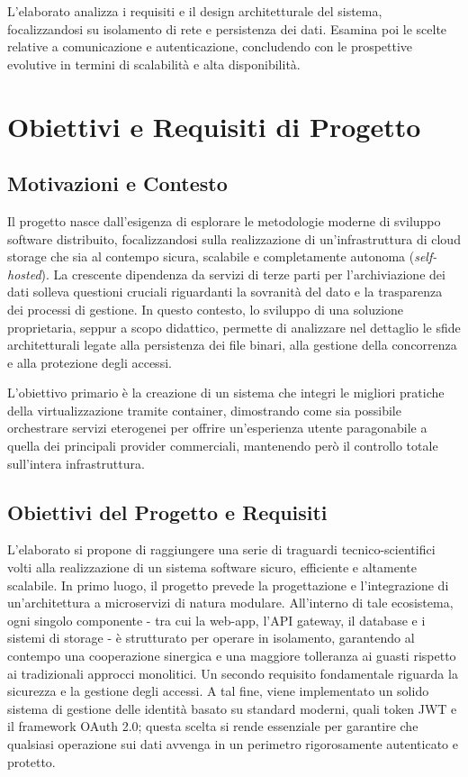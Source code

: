 \documentclass[12pt,a4paper]{report}
\begin{document}
L'elaborato analizza i requisiti e il design architetturale del
sistema, focalizzandosi su isolamento di rete e persistenza dei dati.
Esamina poi le scelte relative a comunicazione e autenticazione,
concludendo con le prospettive evolutive in termini di scalabilità e
alta disponibilità.

\tableofcontents

\cleardoublepage
{}
\setcounter{page}{1}

\chapter{Obiettivi e Requisiti di Progetto}
\label{cap:obiettivi}

\section{Motivazioni e Contesto}
Il progetto nasce dall'esigenza di esplorare le metodologie moderne di
sviluppo software distribuito, focalizzandosi sulla realizzazione di
un'infrastruttura di cloud storage che sia al contempo sicura, scalabile e
completamente autonoma (\textit{self-hosted}). La crescente dipendenza da
servizi di terze parti per l'archiviazione dei dati solleva questioni
cruciali riguardanti la sovranità del dato e la trasparenza dei processi di
gestione. In questo contesto, lo sviluppo di una soluzione proprietaria,
seppur a scopo didattico, permette di analizzare nel dettaglio le sfide
architetturali legate alla persistenza dei file binari, alla gestione della
concorrenza e alla protezione degli accessi.

L'obiettivo primario è la creazione di un sistema che integri le migliori
pratiche della virtualizzazione tramite container, dimostrando come sia
possibile orchestrare servizi eterogenei per offrire un'esperienza utente
paragonabile a quella dei principali provider commerciali, mantenendo però
il controllo totale sull'intera infrastruttura.

\newpage
\section{Obiettivi del Progetto e Requisiti}
L'elaborato si propone di raggiungere una serie di traguardi
tecnico-scientifici volti alla realizzazione di un sistema software
sicuro, efficiente e altamente scalabile. In primo luogo, il progetto
prevede la progettazione e l'integrazione di un'architettura a
microservizi di natura modulare. All'interno di tale ecosistema, ogni
singolo componente - tra cui la web-app, l'API gateway, il database e
i sistemi di storage - è strutturato per operare in isolamento,
garantendo al contempo una cooperazione sinergica e una maggiore
tolleranza ai guasti rispetto ai tradizionali approcci monolitici. Un
secondo requisito fondamentale riguarda la sicurezza e la gestione
degli accessi. A tal fine, viene implementato un solido sistema di
gestione delle identità basato su standard moderni, quali token JWT e
il framework OAuth 2.0; questa scelta si rende essenziale per
garantire che qualsiasi operazione sui dati avvenga in un perimetro
rigorosamente autenticato e protetto.
\end{document}
